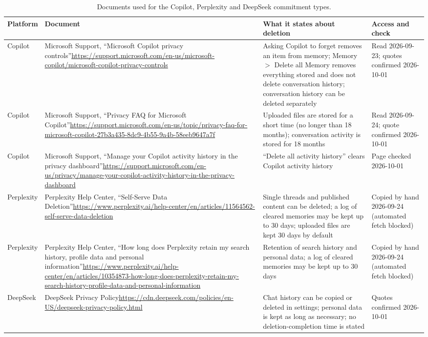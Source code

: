 \documentclass[conference,compsoc]{IEEEtran}
\begin{document}
\begin{table}[t]
\centering
\caption{Documents used for the Copilot, Perplexity and DeepSeek commitment types.}
\label{tab:sources-b}
\footnotesize
\setlength{\tabcolsep}{3pt}
\begin{tabular}{@{}p{}p{}p{}p{}@{}}
\toprule
Platform & Document & What it states about deletion & Access and check \\
\midrule
Copilot & Microsoft Support, ``Microsoft Copilot privacy controls''\newline\url{https://support.microsoft.com/en-us/microsoft-copilot/microsoft-copilot-privacy-controls} & Asking Copilot to forget removes an item from memory; Memory $>$ Delete all Memory removes everything stored and does not delete conversation history; conversation history can be deleted separately & Read 2026-09-23; quotes confirmed 2026-10-01 \\
Copilot & Microsoft Support, ``Privacy FAQ for Microsoft Copilot''\newline\url{https://support.microsoft.com/en-us/topic/privacy-faq-for-microsoft-copilot-27b3a435-8dc9-4b55-9a4b-58eeb9647a7f} & Uploaded files are stored for a short time (no longer than 18 months); conversation activity is stored for 18 months & Read 2026-09-24; quote confirmed 2026-10-01 \\
Copilot & Microsoft Support, ``Manage your Copilot activity history in the privacy dashboard''\newline\url{https://support.microsoft.com/en-us/privacy/manage-your-copilot-activity-history-in-the-privacy-dashboard} & ``Delete all activity history'' clears Copilot activity history & Page checked 2026-10-01 \\
Perplexity & Perplexity Help Center, ``Self-Serve Data Deletion''\newline\url{https://www.perplexity.ai/help-center/en/articles/11564562-self-serve-data-deletion} & Single threads and published content can be deleted; a log of cleared memories may be kept up to 30 days; uploaded files are kept 30 days by default & Copied by hand 2026-09-24 (automated fetch blocked) \\
Perplexity & Perplexity Help Center, ``How long does Perplexity retain my search history, profile data and personal information''\newline\url{https://www.perplexity.ai/help-center/en/articles/10354873-how-long-does-perplexity-retain-my-search-history-profile-data-and-personal-information} & Retention of search history and personal data; a log of cleared memories may be kept up to 30 days & Copied by hand 2026-09-24 (automated fetch blocked) \\
DeepSeek & DeepSeek Privacy Policy\newline\url{https://cdn.deepseek.com/policies/en-US/deepseek-privacy-policy.html} & Chat history can be copied or deleted in settings; personal data is kept as long as necessary; no deletion-completion time is stated & Quotes confirmed 2026-10-01 \\
\bottomrule
\end{tabular}
\end{table}



\end{document}
